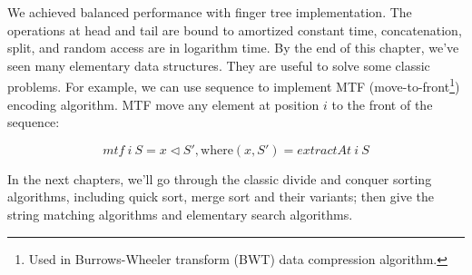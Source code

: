 \documentclass[b5paper]{article}
\begin{document}
We achieved balanced performance with finger tree implementation. The operations at head and tail are bound to amortized constant time, concatenation, split, and random access are in logarithm time\cite{hackage-ftr}. By the end of this chapter, we've seen many elementary data structures. They are useful to solve some classic problems. For example, we can use sequence to implement MTF (move-to-front\footnote{Used in Burrows-Wheeler transform (BWT) data compression algorithm.}) encoding algorithm\cite{mtf-wiki}. MTF move any element at position $i$ to the front of the sequence:

\[
mtf\ i\ S = x \lhd S', \text{where}(x, S') = \textit{extractAt}\ i\ S
\]

In the next chapters, we'll go through the classic divide and conquer sorting algorithms, including quick sort, merge sort and their variants; then give the string matching algorithms and elementary search algorithms.

\begin{Exercise}\label{ex:finger-tree-index}
\end{Exercise}
\end{document}
